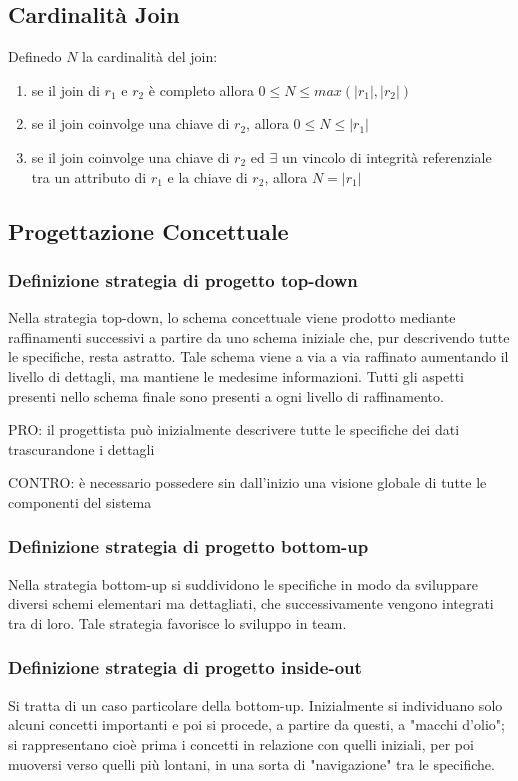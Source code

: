 \subsection{Cardinalità Join}
Definedo $N$ la cardinalità del join:

\begin{enumerate}
  \item se il join di $r_{1}$ e $r_{2}$ è completo allora $ 0 \leq N \leq max(\left\vert{r_{1}}\right\vert, \left\vert{r_{2}}\right\vert)$
  \item se il join coinvolge una chiave di $r_{2}$, allora $ 0 \leq N \leq \left\vert{r_{1}}\right\vert$
  \item se il join coinvolge una chiave di $r_{2}$ ed $\exists$ un vincolo di integrità referenziale
        tra un attributo di $r_{1}$ e la chiave di $r_{2}$, allora $ N = \left\vert{r_{1}}\right\vert $
\end{enumerate}

\subsection{Progettazione Concettuale}
\subsubsection{Definizione strategia di progetto top-down}

Nella strategia top-down, lo schema concettuale viene prodotto mediante raffinamenti
successivi a partire da uno schema iniziale che, pur descrivendo tutte le specifiche,
resta astratto. Tale schema viene a via a via raffinato aumentando il livello di dettagli,
ma mantiene le medesime informazioni. Tutti gli aspetti presenti nello schema finale
sono presenti a ogni livello di raffinamento.

\noindent
PRO: il progettista può inizialmente descrivere tutte le specifiche dei dati
trascurandone i dettagli

\noindent
CONTRO: è necessario possedere sin dall'inizio una visione globale di tutte le componenti
del sistema

\subsubsection{Definizione strategia di progetto bottom-up}

Nella strategia bottom-up si suddividono le specifiche in modo da sviluppare
diversi schemi elementari ma dettagliati, che successivamente vengono integrati
tra di loro. Tale strategia favorisce lo sviluppo in team.

\subsubsection{Definizione strategia di progetto inside-out}

Si tratta di un caso particolare della bottom-up. Inizialmente si individuano solo alcuni
concetti importanti e poi si procede, a partire da questi, a "macchi d'olio"; si rappresentano
cioè prima i concetti in relazione con quelli iniziali, per poi muoversi verso quelli più
lontani, in una sorta di "navigazione" tra le specifiche.